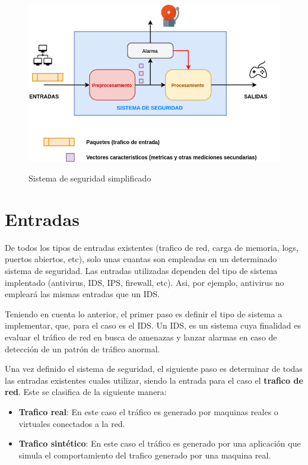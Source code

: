 \documentclass[12pt]{article}
\begin{document}
\begin{figure}[htbp]
\begin{center}
\includegraphics[scale=0.5]{sistema_simplificado2.png}\\[1cm] %
\caption{Sistema de seguridad simplificado}
\end{center}
\end{figure}

\section{Entradas}

De todos los tipos de entradas existentes (trafico de red, carga de memoria, logs, puertos abiertos, etc), solo unas cuantas son empleadas en un determinado sistema de seguridad. Las entradas utilizadas dependen del tipo de sistema implentado (antivirus, IDS, IPS, firewall, etc). Asi, por ejemplo, antivirus no empleará las mismas entradas que un IDS. 

Teniendo en cuenta lo anterior, el primer paso es definir el tipo de sistema a implementar, que, para el caso es el IDS. Un IDS, es un sistema cuya finalidad es evaluar el tráfico de red en busca de amenazas y lanzar alarmas en caso de detección de un patrón de tráfico anormal.

Una vez definido el sistema de seguridad, el siguiente paso es determinar de todas las entradas existentes cuales utilizar, siendo la entrada para el caso el \textbf{trafico de red}. Este se clasifica de la siguiente manera:
\begin{itemize}
\item \textbf{Trafico real}: En este caso el tráfico es generado por maquinas reales o virtuales conectados a la red. 
\item \textbf{Trafico sintético}: En este caso el tráfico es generado por una aplicación que simula el comportamiento del trafico generado por una maquina real. 
\end{itemize}
\end{document}
